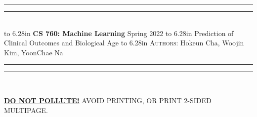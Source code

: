 \documentclass{article}
\newcommand{\lecture}[2]{
\pagestyle{myheadings}
\thispagestyle{plain}
\newpage
\noindent
\begin{center}
\rule{\textwidth}{1.6pt}\vspace*{-\baselineskip}\vspace*{2pt} %
\rule{\textwidth}{0.4pt}\\[1\baselineskip] %
\vbox{\vspace{2mm}
\hbox to 6.28in { {\bf CS 760: Machine Learning} \hfill Spring 2022 }
\vspace{4mm}
\hbox to 6.28in { {\Large \hfill #1  \hfill} }
\vspace{4mm}
\hbox to 6.28in { {\scshape Authors:}  #2 \hfill }}
\vspace{-2mm}
\rule{\textwidth}{0.4pt}\vspace*{-\baselineskip}\vspace{3.2pt} %
\rule{\textwidth}{1.6pt}\\[\baselineskip] %
\end{center}
\vspace*{4mm}
}
\begin{document}
\lecture{Prediction of Clinical Outcomes and Biological Age}{Hokeun Cha, Woojin Kim, YoonChae Na}\hfill

\begin{center}
{\Large {\sf \underline{\textbf{DO NOT POLLUTE!}} AVOID PRINTING, OR PRINT 2-SIDED MULTIPAGE.}}
\end{center}










\end{document}
